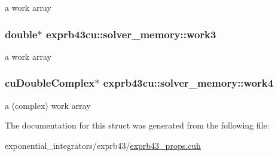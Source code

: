 a work array 

\subsubsection[{\texorpdfstring{work3}{work3}}]{\setlength{\rightskip}{0pt plus 5cm}double$\ast$ exprb43cu\+::solver\+\_\+memory\+::work3}\hypertarget{structexprb43cu_1_1solver__memory_ae3a2fe062018c4b7f97f039feceeb003}{}\label{structexprb43cu_1_1solver__memory_ae3a2fe062018c4b7f97f039feceeb003}


a work array 

\subsubsection[{\texorpdfstring{work4}{work4}}]{\setlength{\rightskip}{0pt plus 5cm}cu\+Double\+Complex$\ast$ exprb43cu\+::solver\+\_\+memory\+::work4}\hypertarget{structexprb43cu_1_1solver__memory_a7db0969d6909faa9beb4965290c52a63}{}\label{structexprb43cu_1_1solver__memory_a7db0969d6909faa9beb4965290c52a63}


a (complex) work array 



The documentation for this struct was generated from the following file\+:\begin{DoxyCompactItemize}
\item 
exponential\+\_\+integrators/exprb43/\hyperlink{exprb43__props_8cuh}{exprb43\+\_\+props.\+cuh}\end{DoxyCompactItemize}
